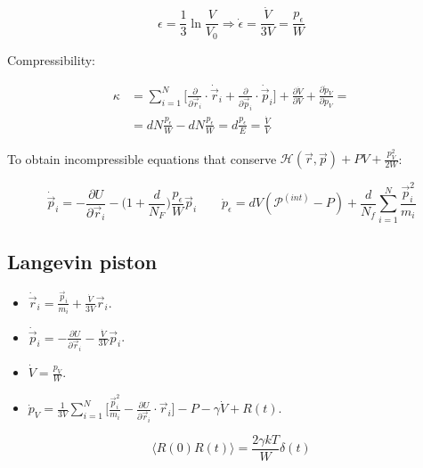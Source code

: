 $$\epsilon = \frac{1}{3}\ln\frac{V}{V_0}\Rightarrow\dot{\epsilon} = \frac{\dot{V}}{3V}=\frac{p_\epsilon}{W}$$

Compressibility:

\begin{align*}
	\kappa & = \sum\limits_{i=1}^N\biggl[\frac{\partial}{\partial\vec{r}_i}\cdot\dot{\vec{r}}_i + \frac{\partial}{\partial\vec{p}_i}\cdot\dot{\vec{p}}_i\biggr] + \frac{\partial\dot{V}}{\partial V} + \frac{\partial\dot{p}_V}{\partial p_V} = \\
				 &= dN\frac{p_\epsilon}{W}-dN\frac{p_\epsilon}{W} = d\frac{p_\epsilon}{E} = \frac{\dot{V}}{V}
\end{align*}

To obtain incompressible equations that conserve $\mathcal{H}(\vec{r},\vec{p}) + PV + \frac{p_V^2}{2W}$:

$$\dot{\vec{p}}_i = -\frac{\partial U}{\partial\vec{r}_i} - \biggl(1+\frac{d}{N_F}\biggr)\frac{p_\epsilon}{W}\vec{p}_i\qquad \dot{p}_\epsilon = dV(\mathcal{P}^{(int)}-P) + \frac{d}{N_f}\sum\limits_{i=1}^N\frac{\vec{p}_i^2}{m_i}$$

	\subsection{Langevin piston}

	\begin{itemize}
		\item $\dot{\vec{r}}_i = \frac{\vec{p}_i}{m_i} + \frac{\dot{V}}{3V}\vec{r}_i$.
		\item $\dot{\vec{p}}_i = -\frac{\partial U}{\partial\vec{r}_i}-\frac{\dot{V}}{3V}\vec{p}_i$.
		\item $\dot{V} = \frac{p_V}{W}$.
		\item $\dot{p}_V = \frac{1}{3V}\sum\limits_{i=1}^N\biggl[\frac{\vec{p}_i^2}{m_i}-\frac{\partial U}{\partial\vec{r}_i}\cdot\vec{r}_i\biggr]-P-\gamma\dot{V}+R(t)$.
	\end{itemize}

	$$\langle R(0)R(t)\rangle = \frac{2\gamma kT}{W}\delta(t)$$
